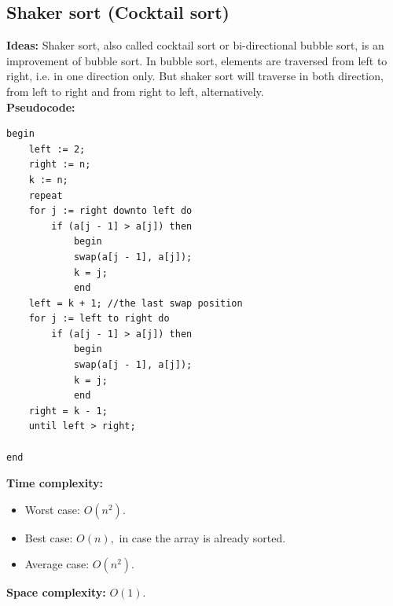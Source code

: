 \documentclass[12pt,a4paper]{article}
\begin{document}
\subsection{Shaker sort (Cocktail sort)}
\label{shakersort}
\textbf{Ideas:} 
Shaker sort, also called cocktail sort or bi-directional bubble sort, is an improvement of bubble sort. In bubble sort, elements are traversed from left to right, i.e. in one direction only. But shaker sort will traverse in both direction, from left to right and from right to left, alternatively. \cite{shaker}\\
\textbf{Pseudocode:} \cite{thayP}
\lstset{language=Pascal} 
\begin{lstlisting}
begin
	left := 2;
	right := n;
	k := n;
	repeat 
	for j := right downto left do
		if (a[j - 1] > a[j]) then
			begin
			swap(a[j - 1], a[j]);
			k = j;
			end
	left = k + 1; //the last swap position
	for j := left to right do
		if (a[j - 1] > a[j]) then
			begin
			swap(a[j - 1], a[j]);
			k = j;
			end
	right = k - 1;
	until left > right;
	
end
\end{lstlisting}
\textbf{Time complexity:} \cite{shaksort}
\begin{itemize}
\item Worst case: $O \left( {n^2} \right).$
\item Best case: $O \left( {n} \right),$ in case the array is already sorted.
\item Average case: $O \left( {n^2} \right).$
\end{itemize}
\textbf{Space complexity:} $O \left( {1} \right).$ \cite{shaksort}
\end{document}
